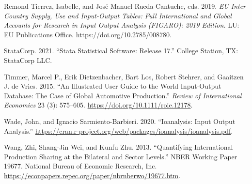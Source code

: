 \begin{CSLReferences}{1}{0}
\leavevmode{}%
Remond-Tierrez, Isabelle, and José Manuel Rueda-Cantuche, eds. 2019. \emph{{EU} Inter-Country Supply, Use and Input-Output Tables: Full International and Global Accounts for Research in Input Output Analysis ({FIGARO}): 2019 Edition.} LU: EU Publications Office. \url{https://doi.org/10.2785/008780}.

\leavevmode{}%
StataCorp. 2021. {``Stata {Statistical} {Software}: {Release} 17.''} College Station, TX: StataCorp LLC.

\leavevmode{}%
Timmer, Marcel P., Erik Dietzenbacher, Bart Los, Robert Stehrer, and Gaaitzen J. de Vries. 2015. {``An {Illustrated} {User} {Guide} to the {World} {Input}-{Output} {Database}: The {Case} of {Global} {Automotive} {Production}.''} \emph{Review of International Economics} 23 (3): 575--605. \url{https://doi.org/10.1111/roie.12178}.

\leavevmode{}%
Wade, John, and Ignacio Sarmiento-Barbieri. 2020. {``Ioanalysis: {Input} {Output} {Analysis}.''} \url{https://cran.r-project.org/web/packages/ioanalysis/ioanalysis.pdf}.

\leavevmode{}%
Wang, Zhi, Shang-Jin Wei, and Kunfu Zhu. 2013. {``Quantifying {International} {Production} {Sharing} at the {Bilateral} and {Sector} {Levels}.''} NBER Working Paper 19677. National Bureau of Economic Research, Inc. \url{https://econpapers.repec.org/paper/nbrnberwo/19677.htm}.

\end{CSLReferences}



\address{%
Enrique Feás\\
Universidad de Alcalá and Elcano Royal Institute\\%
Universidad de Alcalá, Pl. de San Diego, s/n, 28801 Alcalá de Henares, Madrid, Spain\\ Elcano Royal Institute, Calle del Príncipe de Vergara, 51. 28006 Madrid, Spain\\
%
%
\textit{ORCiD: \href{https://orcid.org/0000-0002-9431-6051}{0000-0002-9431-6051}}\\%
\href{mailto:enrique.feas@edu.uah.es}{\nolinkurl{enrique.feas@edu.uah.es}}, \href{mailto:efeas@rielcano.org}{\nolinkurl{efeas@rielcano.org}}%
}
